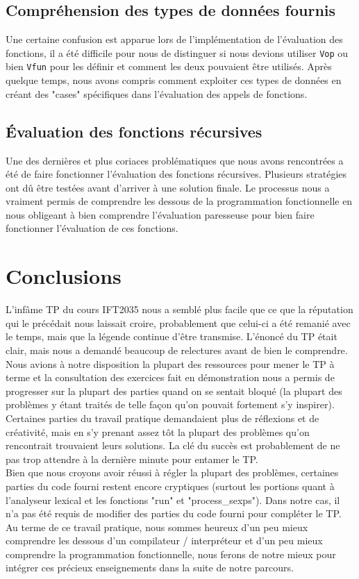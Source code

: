 \documentclass[11pt, letterpaper]{article}
\begin{document}
\subsection{Compréhension des types de données fournis}
Une certaine confusion est apparue lors de l'implémentation de l'évaluation des fonctions, il a été difficile pour nous de distinguer si nous devions utiliser \texttt{Vop} ou bien \texttt{Vfun} pour les définir et comment les deux pouvaient être utilisés. Après quelque temps, nous avons compris comment exploiter ces types de données en créant des "cases" spécifiques dans l'évaluation des appels de fonctions.

\subsection{Évaluation des fonctions récursives}
Une des dernières et plus coriaces problématiques que nous avons rencontrées a été de faire fonctionner l'évaluation des fonctions récursives. Plusieurs stratégies ont dû être testées avant d'arriver à une solution finale. Le processus nous a vraiment permis de comprendre les dessous de la programmation fonctionnelle en nous obligeant à bien comprendre l'évaluation paresseuse pour bien faire fonctionner l'évaluation de ces fonctions.

\section{Conclusions}
L'infâme TP du cours IFT2035 nous a semblé plus facile que ce que la réputation qui le précédait nous laissait croire, probablement que celui-ci a été remanié avec le temps, mais que la légende continue d'être transmise. L'énoncé du TP était clair, mais nous a demandé beaucoup de relectures avant de bien le comprendre. Nous avions à notre disposition la plupart des ressources pour mener le TP à terme et la consultation des exercices fait en démonstration nous a permis de progresser sur la plupart des parties quand on se sentait bloqué (la plupart des problèmes y étant traités de telle façon qu'on pouvait fortement s'y inspirer). Certaines parties du travail pratique demandaient plus de réflexions et de créativité, mais en s'y prenant assez tôt la plupart des problèmes qu'on rencontrait trouvaient leurs solutions. La clé du succès est probablement de ne pas trop attendre à la dernière minute pour entamer le TP.\\

Bien que nous croyons avoir réussi à régler la plupart des problèmes, certaines parties du code fourni restent encore cryptiques (surtout les portions quant à l'analyseur lexical et les fonctions "run" et "process\_sexps"). Dans notre cas, il n'a pas été requis de modifier des parties du code fourni pour compléter le TP.\\

Au terme de ce travail pratique, nous sommes heureux d'un peu mieux comprendre les dessous d'un compilateur / interpréteur et d'un peu mieux comprendre la programmation fonctionnelle, nous ferons de notre mieux pour intégrer ces précieux enseignements dans la suite de notre parcours.
\end{document}
